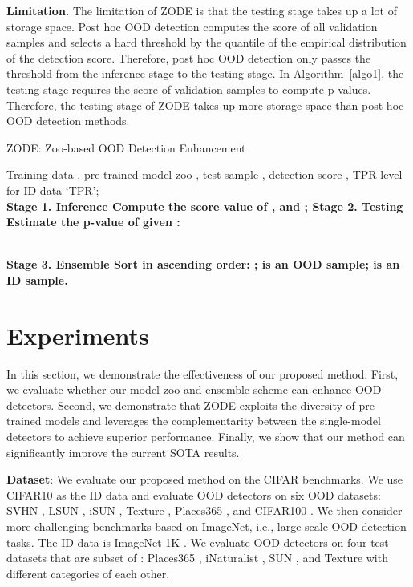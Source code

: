 \documentclass{article} \usepackage{iclr2023_conference,times}
\begin{document}
{\bf Limitation.} The limitation of ZODE is that the testing stage takes up a lot of storage space. Post hoc OOD detection computes the score of all validation samples and selects a hard threshold by the quantile of the empirical distribution of the detection score. Therefore, post hoc OOD detection only passes the threshold from the inference stage to the testing stage. In Algorithm~\ref{algo1}, the testing stage requires the score of validation samples to compute p-values.
Therefore, the testing stage of ZODE takes up more storage space than post hoc OOD detection methods.




\begin{algorithm}[t]
\caption{{ZODE}: Zoo-based OOD Detection Enhancement}\label{algorithm1}
\label{algo1}
\begin{algorithmic}[1]
\REQUIRE Training data , pre-trained model zoo , test sample , detection score ,  TPR level for ID data ‘TPR’;\\ 
\STATE \bf Stage 1. Inference
\STATE Compute the score value of ,  and ;
\STATE \bf Stage 2. Testing
\FOR {} 
\STATE Estimate the p-value of  given :

\ENDFOR\\
\STATE \bf Stage 3. Ensemble
\STATE Sort   in
ascending order: ;
\RETURN  is an OOD sample;
\ELSE
\RETURN  is an ID sample.
\ENDIF
\end{algorithmic}
\end{algorithm}





\section{Experiments}\label{Experiments}

In this section, we demonstrate the effectiveness of our proposed method. 
First, we evaluate whether our model zoo and ensemble scheme can enhance OOD detectors. Second, we demonstrate that ZODE exploits the diversity of pre-trained models and leverages the complementarity between the single-model detectors to achieve superior performance.
Finally, we show that our method can significantly improve the current SOTA results. 

\textbf{Dataset}: 
We evaluate our proposed method on the CIFAR benchmarks. 
We use CIFAR10 \citep{krizhevsky2009learning} as the ID data and evaluate OOD detectors on six OOD datasets: SVHN \citep{netzer2011reading}, LSUN \citep{yu2015lsun}, iSUN \citep{xu2015turkergaze}, Texture \citep{cimpoi2014describing}, Places365 \citep{zhou2017places}, and CIFAR100 \citep{krizhevsky2009learning}.
We then consider more challenging benchmarks based on ImageNet, i.e., large-scale OOD detection tasks. The ID data is ImageNet-1K \citep{deng2009imagenet}. 
We evaluate OOD detectors on four test datasets that are subset of : Places365 \citep{zhou2017places}, iNaturalist \citep{van2018inaturalist}, SUN \citep{xiao2010sun},   and Texture \citep{cimpoi2014describing} with different categories of each other. 
\end{document}
